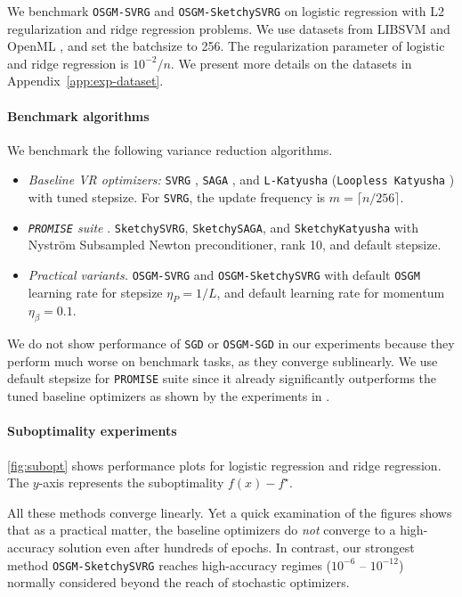 \documentclass{article}
\theoremstyle{definition}
\DeclareRobustCommand{\namerefc}[2]{\hyperref[#2]{\textcolor{#1}{\nameref*{#2}}}}
\newcommand{\ov}{\namerefc{purple}{alg:osgm-svrg}}
\newcommand{\os}{\texttt{OSGM}}
\newcommand{\ovh}{\texttt{OSGM-SVRG}}
\newcommand{\osgdh}{\texttt{OSGM-SGD}}
\newcommand{\osk}{\texttt{OSGM-SketchySVRG}}
\newcommand{\svrg}{\texttt{SVRG}}
\newcommand{\saga}{\texttt{SAGA}}
\newcommand{\kat}{\texttt{L-Katyusha}}
\newcommand{\ssvrg}{\texttt{SketchySVRG}}
\newcommand{\ssaga}{\texttt{SketchySAGA}}
\newcommand{\skat}{\texttt{SketchyKatyusha}}
\newcommand{\promise}{\texttt{PROMISE}}
\newcommand{\sgd}{\texttt{SGD}}
\begin{document}
We benchmark {\ovh} and {\osk} on logistic regression with L2 regularization and ridge regression problems. 
We use datasets from LIBSVM \cite{chang2011libsvm} and OpenML \cite{vanschoren2013openml}, and set the batchsize to 256. 
The regularization parameter of logistic and ridge regression is ${10^{-2}}/{n}$.
We present more details on the datasets in Appendix~\ref{app:exp-dataset}.

\paragraph{Benchmark algorithms} We benchmark the following variance reduction algorithms.
\begin{itemize}
  \item \emph{Baseline VR optimizers:} {\svrg} \cite{johnson2013accelerating}, {\saga} \cite{defazio2014saga}, and {\kat} (\texttt{Loopless Katyusha} \cite{kovalev2020don}) with tuned stepsize. For {\svrg}, the update frequency is $m=\lceil n/256 \rceil$.
  \item \emph{{\promise} suite} \cite{frangella2024promise}. {\ssvrg}, {\ssaga}, and {\skat} with Nystr\"om Subsampled Newton preconditioner, rank 10, and default stepsize.
  \item \emph{Practical {\ov} variants.} {\ovh} and {\osk} with default {\os} learning rate for stepsize $\eta_P=1/L$, and default learning rate for momentum $\eta_{\beta}=0.1$.
\end{itemize}
We do not show performance of {\sgd} or {\osgdh} in our experiments because they perform much worse on benchmark tasks, as they converge sublinearly.
We use default stepsize for {\promise} suite since it already significantly outperforms the tuned baseline optimizers as shown by the experiments in \cite{frangella2024promise}.

\paragraph{Suboptimality experiments} \cref{fig:subopt} shows performance plots for logistic regression and ridge regression. The $y$-axis represents the suboptimality $f(x) - f^\star$. 

All these methods converge linearly. Yet a quick examination of the figures shows that as a practical matter, the baseline  optimizers do \emph{not} converge to a high-accuracy solution even after hundreds of epochs. In contrast, our strongest method {\osk} reaches high-accuracy regimes ($10^{-6}$ -- $10^{-12}$) normally considered beyond the reach of stochastic optimizers.
\end{document}
